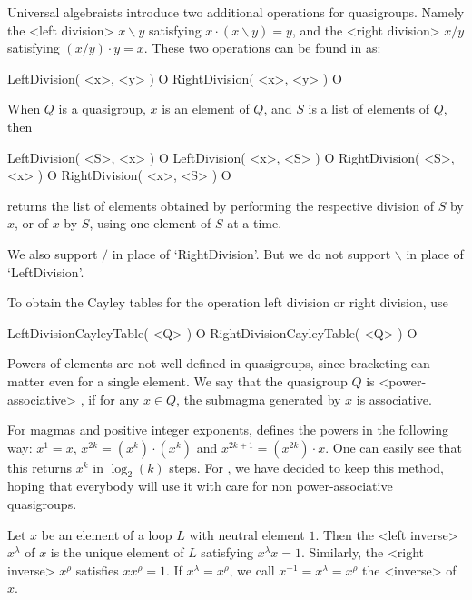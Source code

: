 Universal algebraists introduce two additional operations for quasigroups.
Namely the <left division>
%
%
 $x\backslash y$ satisfying $x\cdot(x\backslash
y)=y$, and the <right division>
%
%
 $x/y$ satisfying $(x/y)\cdot y=x$. These
two operations can be found in {\LOOPS} as:

\>LeftDivision( <x>, <y> ) O
\>RightDivision( <x>, <y> ) O

When $Q$ is a quasigroup, $x$ is an element of $Q$, and $S$ is a list of
elements of $Q$, then

\>LeftDivision( <S>, <x> ) O
\>LeftDivision( <x>, <S> ) O
\>RightDivision( <S>, <x> ) O
\>RightDivision( <x>, <S> ) O

returns the list of elements obtained by performing the respective
division of $S$ by $x$, or of $x$ by $S$, using one element of $S$ at a time.

We also support $/$ in place of `RightDivision'. But we do not support
$\backslash$ in place of `LeftDivision'.

To obtain the Cayley tables for the operation left division or
right division, use

\>LeftDivisionCayleyTable( <Q> ) O
\>RightDivisionCayleyTable( <Q> ) O


Powers of elements are not well-defined in quasigroups, since bracketing can
matter even for a single element. We say that the quasigroup $Q$ is
<power-associative>
%
%
, if for any $x\in Q$, the submagma generated by $x$ is
associative.

For magmas and positive integer exponents, {\GAP} defines the powers in the
following way: $x^1=x$, $x^{2k}=(x^k)\cdot(x^k)$ and $x^{2k+1}=(x^{2k})\cdot
x$. One can easily see that this returns $x^k$ in $\log_2(k)$ steps. For
{\LOOPS}, we have decided to keep this method, hoping that everybody will use
it with care for non power-associative quasigroups.

Let $x$ be an element of a loop $L$ with neutral element $1$. Then the
<left inverse>
%
%
 $x^\lambda$ of $x$ is the unique element of $L$ satisfying
$x^\lambda x=1$. Similarly, the <right inverse>
%
%
 $x^\rho$ satisfies
$xx^\rho=1$. If $x^\lambda=x^\rho$, we call $x^{-1}=x^\lambda=x^\rho$ the
<inverse>
%
%
 of $x$.

